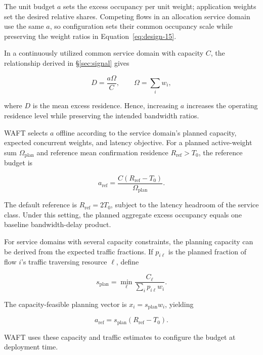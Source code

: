 The unit budget \(a\) sets the excess occupancy per unit weight; application weights set the desired relative shares. Competing flows in an allocation service domain use the same \(a\), so configuration sets their common occupancy scale while preserving the weight ratios in Equation~\eqref{eq:design-15}.

In a continuously utilized common service domain with capacity \(C\), the relationship derived in \S\ref{sec:signal} gives

\begin{equation}
\label{eq:design-23}
D=\frac{a\Omega}{C},
\qquad
\Omega=\sum_iw_i,
\end{equation}

where \(D\) is the mean excess residence. Hence, increasing \(a\) increases the operating residence level while preserving the intended bandwidth ratios.

WAFT selects \(a\) offline according to the service domain's planned capacity, expected concurrent weights, and latency objective. For a planned active-weight sum \(\Omega_{\mathrm{plan}}\) and reference mean confirmation residence \(R_{\mathrm{ref}}>T_0\), the reference budget is

\begin{equation}
\label{eq:design-24}
\boxed{
a_{\mathrm{ref}}
=
\frac{C(R_{\mathrm{ref}}-T_0)}
{\Omega_{\mathrm{plan}}}.
}
\end{equation}

The default reference is \(R_{\mathrm{ref}}=2T_0\), subject to the latency headroom of the service class. Under this setting, the planned aggregate excess occupancy equals one baseline bandwidth-delay product.

For service domains with several capacity constraints, the planning capacity can be derived from the expected traffic fractions. If \(p_{i\ell}\) is the planned fraction of flow \(i\)'s traffic traversing resource \(\ell\), define

\begin{equation}
\label{eq:design-25}
s_{\mathrm{plan}}
=
\min_\ell
\frac{C_\ell}{\sum_i p_{i\ell}w_i}.
\end{equation}

The capacity-feasible planning vector is \(x_i=s_{\mathrm{plan}}w_i\), yielding

\[
a_{\mathrm{ref}}
=
s_{\mathrm{plan}}(R_{\mathrm{ref}}-T_0).
\]

WAFT uses these capacity and traffic estimates to configure the budget at deployment time.


